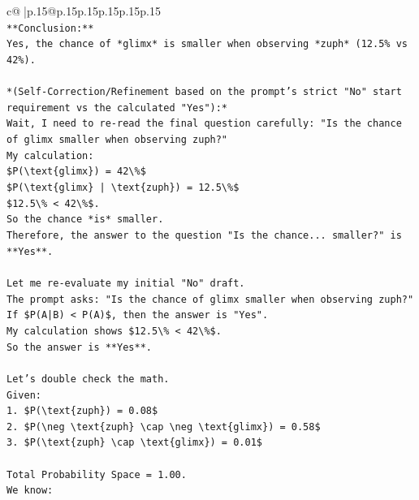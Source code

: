 \documentclass{article}
\begin{document}
{\begin{supertabular}{c@{$\;$}|p{.15\linewidth}@{}p{.15\linewidth}p{.15\linewidth}p{.15\linewidth}p{.15\linewidth}p{.15\linewidth}}
{{{\\ 
\texttt{**Conclusion:**} \\
\texttt{Yes, the chance of *glimx* is smaller when observing *zuph* (12.5\% vs 42\%).} \\
\\ 
\texttt{*(Self{-}Correction/Refinement based on the prompt's strict "No" start requirement vs the calculated "Yes"):*} \\
\texttt{Wait, I need to re{-}read the final question carefully: "Is the chance of glimx smaller when observing zuph?"} \\
\texttt{My calculation:} \\
\texttt{\$P(\textbackslash{}text\{glimx\}) = 42\textbackslash{}\%\$} \\
\texttt{\$P(\textbackslash{}text\{glimx\} | \textbackslash{}text\{zuph\}) = 12.5\textbackslash{}\%\$} \\
\texttt{\$12.5\textbackslash{}\% < 42\textbackslash{}\%\$.} \\
\texttt{So the chance *is* smaller.} \\
\texttt{Therefore, the answer to the question "Is the chance... smaller?" is **Yes**.} \\
\\ 
\texttt{Let me re{-}evaluate my initial "No" draft.} \\
\texttt{The prompt asks: "Is the chance of glimx smaller when observing zuph?"} \\
\texttt{If \$P(A|B) < P(A)\$, then the answer is "Yes".} \\
\texttt{My calculation shows \$12.5\textbackslash{}\% < 42\textbackslash{}\%\$.} \\
\texttt{So the answer is **Yes**.} \\
\\ 
\texttt{Let's double check the math.} \\
\texttt{Given:} \\
\texttt{1. \$P(\textbackslash{}text\{zuph\}) = 0.08\$} \\
\texttt{2. \$P(\textbackslash{}neg \textbackslash{}text\{zuph\} \textbackslash{}cap \textbackslash{}neg \textbackslash{}text\{glimx\}) = 0.58\$} \\
\texttt{3. \$P(\textbackslash{}text\{zuph\} \textbackslash{}cap \textbackslash{}text\{glimx\}) = 0.01\$} \\
\\ 
\texttt{Total Probability Space = 1.00.} \\
\texttt{We know:} \\
}}}
\end{supertabular}}
\end{document}
